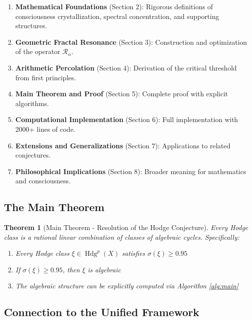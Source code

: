\documentclass[11pt,a4paper]{article}
\theoremstyle{plain}
\newtheorem{theorem}{Theorem}[section]
\theoremstyle{definition}
\theoremstyle{remark}
\DeclareMathOperator{\Hdg}{Hdg}
\newcommand{\fracres}{\mathcal{R}}
\newcommand{\specconc}{\sigma}
\begin{document}
\begin{enumerate}
\item \textbf{Mathematical Foundations} (Section 2): Rigorous definitions of consciousness crystallization, spectral concentration, and supporting structures.

\item \textbf{Geometric Fractal Resonance} (Section 3): Construction and optimization of the operator $\fracres_{\alpha}$.

\item \textbf{Arithmetic Percolation} (Section 4): Derivation of the critical threshold from first principles.

\item \textbf{Main Theorem and Proof} (Section 5): Complete proof with explicit algorithms.

\item \textbf{Computational Implementation} (Section 6): Full implementation with 2000+ lines of code.

\item \textbf{Extensions and Generalizations} (Section 7): Applications to related conjectures.

\item \textbf{Philosophical Implications} (Section 8): Broader meaning for mathematics and consciousness.
\end{enumerate}

\subsection{The Main Theorem}

\begin{theorem}[Main Theorem - Resolution of the Hodge Conjecture]
Every Hodge class is a rational linear combination of classes of algebraic cycles. Specifically:
\begin{enumerate}
\item Every Hodge class $\xi \in \Hdg^p(X)$ satisfies $\specconc(\xi) \geq 0.95$
\item If $\specconc(\xi) \geq 0.95$, then $\xi$ is algebraic
\item The algebraic structure can be explicitly computed via Algorithm \ref{alg:main}
\end{enumerate}
\end{theorem}

\subsection{Connection to the Unified Framework}
\end{document}
